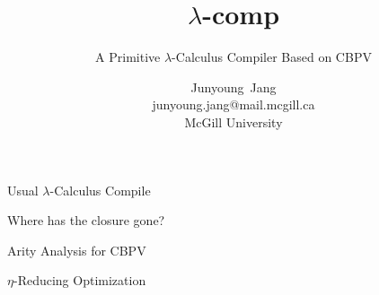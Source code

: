 \documentclass[letterpaper,10pt,aspectratio=169,dvipsnames]{beamer}
\title[\texorpdfstring{\(\lambda\)-comp}{lambdacomp}: A Primitive \texorpdfstring{\(\lambda\)-Calculus}{Lambda Calculus} Compiler Based on CBPV]{\(\lambda\)-comp}
\subtitle{A Primitive \(\lambda\)-Calculus Compiler Based on CBPV}
\author[Junyoung Jang]{\parbox{10em}{\centering Junyoung~Jang\\{}{\scriptsize junyoung.jang@mail.mcgill.ca}\\{}{\scriptsize McGill University}}}
\date{}
\begin{document}
\begin{frame}[plain]
  \titlepage
\end{frame}

\begin{frame}{Usual \(\lambda\)-Calculus Compile}
\end{frame}

\begin{frame}{Where has the closure gone?}
\end{frame}

\begin{frame}{Arity Analysis for CBPV}
\end{frame}

\begin{frame}{\(\eta\)-Reducing Optimization}
\end{frame}
\end{document}
